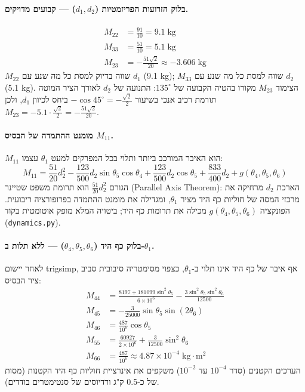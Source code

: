 \documentclass[11pt,a4paper]{article}
\begin{document}
\paragraph{בלוק הזרועות הפריזמטיות ($d_1,d_2$) — קבועים מדויקים.}
\begin{align}
M_{22} &= \frac{91}{10} = 9.1\;\mathrm{kg} \\
M_{33} &= \frac{51}{10} = 5.1\;\mathrm{kg} \\
M_{23} &= -\frac{51\sqrt{2}}{20} \approx -3.606\;\mathrm{kg}
\end{align}
$M_{22}$ שווה בדיוק למסת כל מה שנע עם $d_1$ (9.1 kg); $M_{33}$ שווה למסת כל מה שנע עם $d_2$ (5.1 kg). הצימוד $M_{23}$ מקורו בהטיה הקבועה של $135^{\circ}$: התנועה של $d_2$ לאורך הציר המוטה תורמת רכיב אנכי בשיעור $-\cos 45^{\circ}=-\tfrac{\sqrt{2}}{2}$ ביחס לכיוון $d_1$, ולכן $M_{23} = -5.1\cdot\tfrac{\sqrt{2}}{2}=-\tfrac{51\sqrt{2}}{20}$.

\paragraph{מומנט ההתמדה של הבסיס $M_{11}$.}
$M_{11}$ הוא האיבר המורכב ביותר ותלוי בכל המפרקים למעט $\theta_1$ עצמו:
\begin{equation}
M_{11} = \frac{51}{20}d_2^2 - \frac{123}{500}d_2\sin\theta_5\cos\theta_4 + \frac{123}{500}d_2\cos\theta_5 + \frac{833}{400}d_2 + g(\theta_4,\theta_5,\theta_6)
\end{equation}
הגורם $\tfrac{51}{20}d_2^2$ הוא תרומת משפט שטיינר (\textenglish{Parallel Axis Theorem}): הארכת $d_2$ מרחיקה את מרכזי המסה של חוליות כף היד מציר $\theta_1$, ומגדילה את מומנט ההתמדה בפרופורציה ריבועית. הפונקציה $g(\theta_4,\theta_5,\theta_6)$ מכילה את תרומות כף היד; ביטויה המלא מופק אוטומטית בקוד (\texttt{dynamics.py}).

\paragraph{בלוק כף היד ($\theta_4,\theta_5,\theta_6$) — ללא תלות ב-$\theta_1$.}
לאחר יישום \textenglish{trigsimp}, אף איבר של כף היד אינו תלוי ב-$\theta_1$, כצפוי מסימטריה סיבובית סביב ציר הבסיס:
\begin{align}
M_{44} &= \frac{8197 + 181099\sin^2\!\theta_5}{6\times10^6} - \frac{3\sin^2\!\theta_5\sin^2\!\theta_6}{12500} \\
M_{45} &= -\frac{3}{25000}\sin\theta_5\sin(2\theta_6) \\
M_{46} &= \frac{487}{10^6}\cos\theta_5 \\
M_{55} &= \frac{60927}{2\times10^6} + \frac{3}{12500}\sin^2\!\theta_6 \\
M_{66} &= \frac{487}{10^6} \approx 4.87\times10^{-4}\;\mathrm{kg{\cdot}m^2}
\end{align}
הערכים הקטנים (סדר $10^{-4}$ עד $10^{-2}$) משקפים את אינרציית חוליות כף היד הקטנות (מסות של כ-0.5 ק"ג ורדיוסים של סנטימטרים בודדים).
\end{document}

